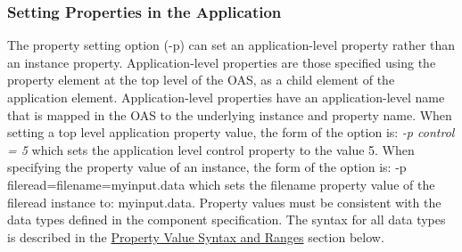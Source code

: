 \documentclass[10pt, a4paper, oneside]{article}
\renewcommand\_{\textunderscore\allowbreak} %
\begin{document}
{\subsubsection{Setting Properties in the Application}The property setting option (-p) can set an application-level property rather than an instance property.  Application-level properties are those specified using the property element at the top level of the OAS, as a child element of the application element. Application-level properties have an application-level name that is mapped in the OAS to the underlying instance and property name. When setting a top level application property value, the form of the option is: \emph{-p control = 5 }which sets the application level control property to the value 5. When specifying the property value of an instance, the form of the option is: -p file\_read=filename=myinput.data which sets the filename property value of the file\_read instance to: myinput.data. Property values must be consistent with the data types defined in the component specification.  The syntax for all data types is described in the \hyperlink{sec:Property Value Syntax and Ranges} {Property Value Syntax and Ranges} section below.
\newpage
}
\end{document}
